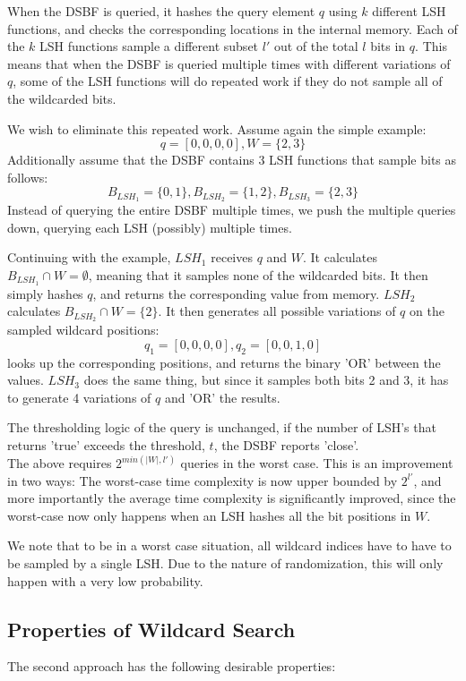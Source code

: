 \documentclass[a4paper,11pt]{article}
\begin{document}
When the DSBF is queried, it hashes the query element $q$ using $k$ different LSH functions, and checks the corresponding locations in the internal memory. Each of the $k$ LSH functions sample a different subset $l'$ out of the total $l$ bits in $q$. This means that when the DSBF is queried multiple times with different variations of $q$, some of the LSH functions will do repeated work if they do not sample all of the wildcarded bits.

We wish to eliminate this repeated work. Assume again the simple example:
\[q=[0,0,0,0], W=\{2,3\}\]
Additionally assume that the DSBF contains 3 LSH functions that sample bits as follows:
\[B_{LSH_1}=\{0,1\}, B_{LSH_2}=\{1,2\}, B_{LSH_3}=\{2,3\}\]
Instead of querying the entire DSBF multiple times, we push the multiple queries down, querying each LSH (possibly) multiple times.

Continuing with the example, $LSH_1$ receives $q$ and $W$. It calculates $B_{LSH_1} \cap W = \emptyset $, meaning that it samples none of the wildcarded bits. It then simply hashes $q$, and returns the corresponding value from memory.
$LSH_2$ calculates $B_{LSH_2} \cap W = \{2\}$. It then generates all possible variations of $q$ on the sampled wildcard positions:
\[q_1=[0,0,0,0], q_2=[0,0,1,0]\]
looks up the corresponding positions, and returns the binary 'OR' between the values.
$LSH_3$ does the same thing, but since it samples both bits 2 and 3, it has to generate 4 variations of $q$ and 'OR' the results.

The thresholding logic of the query is unchanged, if the number of LSH's that returns 'true' exceeds the threshold, $t$, the DSBF reports 'close'.\\

\label{lbl:worst_case}
The above requires $2^{min(|W|, l')}$ queries in the worst case.
This is an improvement in two ways: The worst-case time complexity is now upper bounded by $2^{l'}$, and more importantly the average time complexity is significantly improved, since the worst-case now only happens when an LSH hashes all the bit positions in $W$.

We note that to be in a worst case situation, all wildcard indices have to have to be sampled by a single LSH. Due to the nature of randomization, this will only happen with a very low probability.

\subsection{Properties of Wildcard Search}
The second approach has the following desirable properties:
\end{document}

